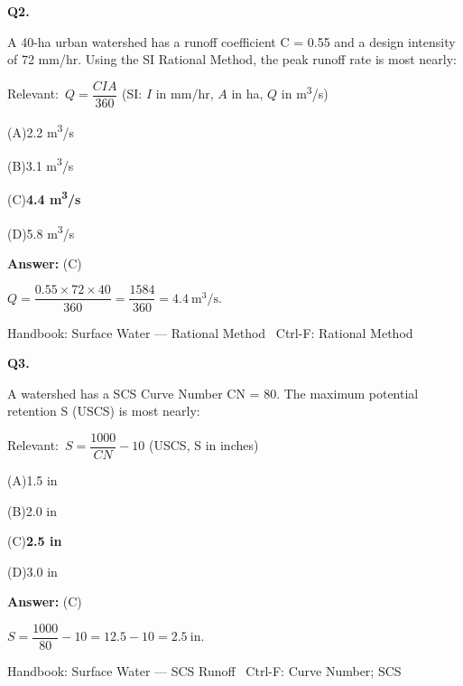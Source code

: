 \documentclass[11pt]{article}
\newcommand{\correct}[1]{\textbf{#1}\;{\color{accent}$\checkmark$}}
\newcommand{\optline}[2]{\par\noindent\hspace{1.2em}(#1)\hspace{0.6em}#2}
\begin{document}
\vspace{9pt}
\filbreak
\textbf{\color{accent}Q2.}\par\vspace{2pt}
A 40-ha urban watershed has a runoff coefficient C = 0.55 and a design intensity of 72 mm/hr. Using the SI Rational Method, the peak runoff rate is most nearly:\par\vspace{3pt}
{\small\color{soft}Relevant:}\ $Q = \dfrac{CIA}{360}$ (SI: $I$ in mm/hr, $A$ in ha, $Q$ in m\textsuperscript{3}/s)\par\vspace{3pt}
\optline{A}{2.2 m\textsuperscript{3}/s}
\optline{B}{3.1 m\textsuperscript{3}/s}
\optline{C}{\correct{4.4 m\textsuperscript{3}/s}}
\optline{D}{5.8 m\textsuperscript{3}/s}
\par\vspace{3pt}
\vspace{2pt}\par\noindent\colorbox{boxbg}{\parbox{\dimexpr\linewidth-2\fboxsep\relax}{%
\vspace{2pt}\textbf{Answer:} (C)\par\vspace{2pt}
{\small $Q = \dfrac{0.55 \times 72 \times 40}{360} = \dfrac{1584}{360} = 4.4\ \mathrm{m^3/s}$.}\par\vspace{2pt}
{\footnotesize\color{soft}Handbook: Surface Water --- Rational Method \textbullet\ Ctrl-F: Rational Method}\vspace{2pt}
}}
\vspace{9pt}
\filbreak
\textbf{\color{accent}Q3.}\par\vspace{2pt}
A watershed has a SCS Curve Number CN = 80. The maximum potential retention S (USCS) is most nearly:\par\vspace{3pt}
{\small\color{soft}Relevant:}\ $S = \dfrac{1000}{CN} - 10$ (USCS, S in inches)\par\vspace{3pt}
\optline{A}{1.5 in}
\optline{B}{2.0 in}
\optline{C}{\correct{2.5 in}}
\optline{D}{3.0 in}
\par\vspace{3pt}
\vspace{2pt}\par\noindent\colorbox{boxbg}{\parbox{\dimexpr\linewidth-2\fboxsep\relax}{%
\vspace{2pt}\textbf{Answer:} (C)\par\vspace{2pt}
{\small $S = \dfrac{1000}{80} - 10 = 12.5 - 10 = 2.5\ \mathrm{in}$.}\par\vspace{2pt}
{\footnotesize\color{soft}Handbook: Surface Water --- SCS Runoff \textbullet\ Ctrl-F: Curve Number; SCS}\vspace{2pt}
}}
\end{document}
